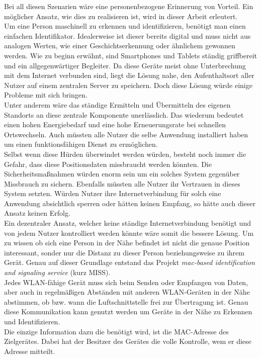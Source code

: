 \documentclass[]{report}
\begin{document}
Bei all diesen Szenarien wäre eine personenbezogene Erinnerung von Vorteil. Ein möglicher Ansatz, wie dies zu realisieren ist, wird in dieser Arbeit erleutert. \\ 
Um eine Person maschinell zu erkennen und identifizieren, benötigt man einen einfachen Identifikator. Idealerweise ist dieser bereits digital und muss nicht aus analogen Werten, wie einer Geschichtserkennung oder ähnlichem gewonnen werden. Wie zu beginn erwähnt, sind Smartphones und Tablets ständig griffbereit und ein allgegenwärtiger Begleiter. Da diese Geräte meist ohne Unterbrechung mit dem Internet verbunden sind, liegt die Lösung nahe, den Aufenthaltsort aller Nutzer auf einem zentralen Server zu speichern. Doch diese Lösung würde einige Probleme mit sich bringen. \\
Unter anderem wäre das ständige Ermitteln und Übermitteln des eigenen Standorts an diese zentrale Komponente unerlässlich. Das wiederum bedeutet einen hohen Energiebedarf und eine hohe Erneuerungsrate bei schnellen Ortswechseln. Auch müssten alle Nutzer die selbe Anwendung installiert haben um einen funktionsfähigen Dienst zu ermöglichen. \\
Selbst wenn diese Hürden überwindet werden würden, besteht noch immer die Gefahr, dass diese Positionsdaten missbraucht werden könnten. Die Sicherheitsmaßnahmen würden enorm sein um ein solches System gegenüber Missbrauch zu sichern. Ebenfalls müssten alle Nutzer ihr Vertrauen in dieses System setzten. Würden Nutzer ihre Internetverbindung für solch eine Anwendung absichtlich sperren oder hätten keinen Empfang, so hätte auch dieser Ansatz keinen Erfolg.\\
Ein dezentraler Ansatz, welcher keine ständige Internetverbindung benötigt und von jedem Nutzer kontrolliert werden könnte wäre somit die bessere Lösung. Um zu wissen ob sich eine Person in der Nähe befindet ist nicht die genaue Position interessant, sonder nur die Distanz zu dieser Person beziehungsweise zu ihrem Gerät. Genau auf dieser Grundlage entstand das Projekt \textit{mac-based identification and signaling service} (kurz MISS).\\
Jedes WLAN-fähige Gerät muss sich beim Senden oder Empfangen von Daten, aber auch in regelmäßigen Abständen mit anderen WLAN-Geräten in der Nähe abstimmen, ob bzw. wann die Luftschnittstelle frei zur Übertragung ist. Genau diese Kommunikation kann genutzt werden um Geräte in der Nähe zu Erkennen und Identifizieren.\\ Die einzige Information dazu die benötigt wird, ist die MAC-Adresse des Zielgerätes. Dabei hat der Besitzer des Gerätes die volle Kontrolle, wem er diese Adresse mitteilt. \\
\end{document}
